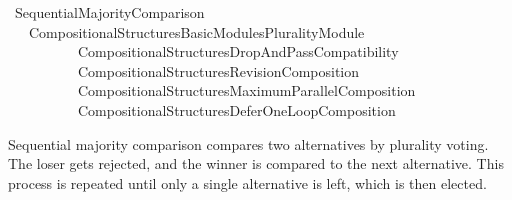 %
\begin{isabellebody}%
%
%
\isadelimdocument
\isanewline
%
\endisadelimdocument
%
\isatagdocument
\isanewline
\isanewline
%
\isamarkuptrue%
%
\endisatagdocument
{\isafolddocument}%
%
\isadelimdocument
%
\endisadelimdocument
%
\isadelimtheory
%
\endisadelimtheory
%
\isatagtheory
{}\isamarkupfalse%
\ Sequential{\isacharunderscore}{\kern0pt}Majority{\isacharunderscore}{\kern0pt}Comparison\isanewline
\ \ \ {\isachardoublequoteopen}Compositional{\isacharunderscore}{\kern0pt}Structures{\isacharslash}{\kern0pt}Basic{\isacharunderscore}{\kern0pt}Modules{\isacharslash}{\kern0pt}Plurality{\isacharunderscore}{\kern0pt}Module{\isachardoublequoteclose}\isanewline
\ \ \ \ \ \ \ \ \ \ {\isachardoublequoteopen}Compositional{\isacharunderscore}{\kern0pt}Structures{\isacharslash}{\kern0pt}Drop{\isacharunderscore}{\kern0pt}And{\isacharunderscore}{\kern0pt}Pass{\isacharunderscore}{\kern0pt}Compatibility{\isachardoublequoteclose}\isanewline
\ \ \ \ \ \ \ \ \ \ {\isachardoublequoteopen}Compositional{\isacharunderscore}{\kern0pt}Structures{\isacharslash}{\kern0pt}Revision{\isacharunderscore}{\kern0pt}Composition{\isachardoublequoteclose}\isanewline
\ \ \ \ \ \ \ \ \ \ {\isachardoublequoteopen}Compositional{\isacharunderscore}{\kern0pt}Structures{\isacharslash}{\kern0pt}Maximum{\isacharunderscore}{\kern0pt}Parallel{\isacharunderscore}{\kern0pt}Composition{\isachardoublequoteclose}\isanewline
\ \ \ \ \ \ \ \ \ \ {\isachardoublequoteopen}Compositional{\isacharunderscore}{\kern0pt}Structures{\isacharslash}{\kern0pt}Defer{\isacharunderscore}{\kern0pt}One{\isacharunderscore}{\kern0pt}Loop{\isacharunderscore}{\kern0pt}Composition{\isachardoublequoteclose}\isanewline
{}%
\endisatagtheory
{\isafoldtheory}%
%
\isadelimtheory
%
\endisadelimtheory
%
\begin{isamarkuptext}%
Sequential majority comparison compares two alternatives by plurality voting.
The loser gets rejected, and the winner is compared to the next alternative.
This process is repeated until only a single alternative is left, which is
then elected.%
\end{isamarkuptext}\isamarkuptrue%
%
\isadelimdocument
%
\endisadelimdocument
%
\isatagdocument
%
\isamarkuptrue%
%
\endisatagdocument
{\isafolddocument}%
%
\isadelimdocument
%
\endisadelimdocument
{}\isamarkupfalse%

\end{isabellebody}
